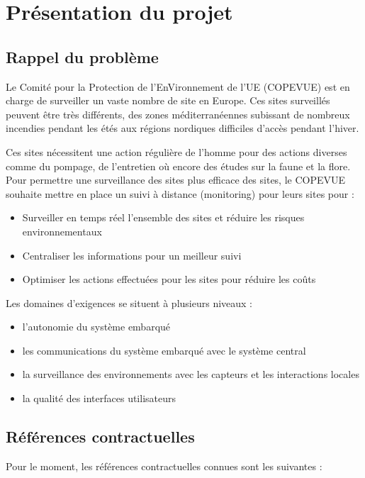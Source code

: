 \section{Présentation du projet}

\subsection{Rappel du problème}

Le Comité pour la Protection de l'EnVironnement de l'UE (COPEVUE) est en
charge de surveiller un vaste nombre de site en Europe. Ces sites
surveillés peuvent être très différents, des zones méditerranéennes
subissant de nombreux incendies pendant les étés aux régions nordiques
difficiles d'accès pendant l'hiver. 

Ces sites nécessitent une action régulière de l'homme pour des actions
diverses comme du pompage, de l'entretien où encore des études sur la faune
et la flore. Pour permettre une surveillance des sites plus efficace des
sites, le COPEVUE souhaite mettre en place un suivi à distance (monitoring)
pour leurs sites pour : 

\begin{itemize}
\item Surveiller en temps réel l'ensemble des sites et réduire les risques environnementaux
\item Centraliser les informations pour un meilleur suivi
\item Optimiser les actions effectuées pour les sites pour réduire les coûts
\end{itemize}

Les domaines d'exigences se situent à plusieurs niveaux : 

\begin{itemize}
\item l'autonomie du système embarqué
\item les communications du système embarqué avec le système central
\item la surveillance des environnements avec les capteurs et les interactions locales
\item la qualité des interfaces utilisateurs
\end{itemize}


\subsection{Références contractuelles}

Pour le moment, les références contractuelles connues sont les suivantes :

